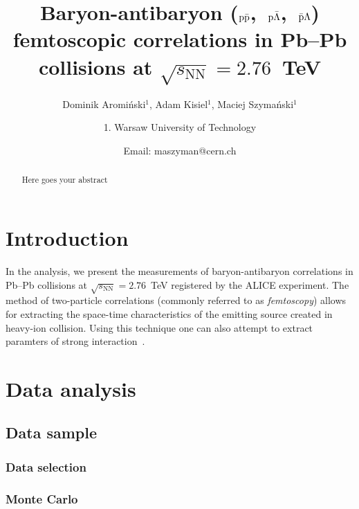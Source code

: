 \documentclass[ALICE,manyauthors]{ALICE_analysis_notes}
\newcommand{\pap}{$\rm p\bar{\rm p}$}
\newcommand{\pal}{$\rm p\bar{\rm \Lambda}$}
\newcommand{\apl}{$\bar{\rm p }\Lambda$}
\begin{document}
%
%
%
\begin{titlepage}
  \PHdate{\today}
  \title{Baryon-antibaryon (\pap,~\pal,~\apl) femtoscopic correlations in Pb--Pb collisions at $\sqrt{s_{\mathrm{NN}}}=2{.}76$~TeV}
  \author{Dominik Aromi\'nski$^{1}$, Adam Kisiel$^{1}$, Maciej Szyma\'nski$^{1}$}
  \author{
    1. Warsaw University of Technology\\
  }
  \author{Email: maszyman@cern.ch}
  \begin{abstract}
    Here goes your abstract 
  \end{abstract}
\end{titlepage}
%

\section{Introduction}
\label{sec:overview}
In the analysis, we present the measurements of baryon-antibaryon correlations in Pb--Pb collisions at $\sqrt{s_{\mathrm{NN}}}=2.76$~TeV registered by the ALICE experiment. The method of two-particle correlations (commonly referred to as \emph{femtoscopy})  allows for extracting the space-time characteristics of the emitting source created in heavy-ion collision. Using this technique one can also attempt to extract paramters of strong interaction~\cite{Kisiel:2014mma}.

\section{Data analysis}
\label{sec:analysis}

\subsection{Data sample}

\subsubsection{Data selection}

\subsubsection{Monte Carlo}
\end{document}
